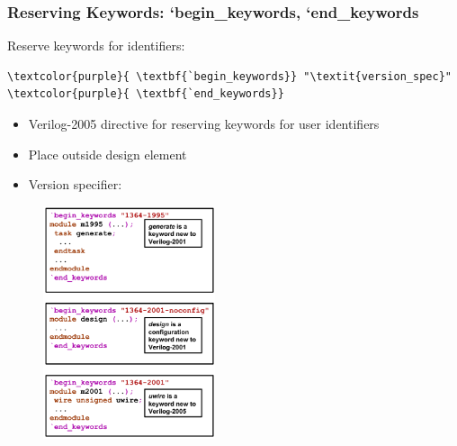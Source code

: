 \documentclass[t, notes, xcolor=table]{beamer}
\begin{document}
\begin{frame}[fragile]
\frametitle{Reserving Keywords: `begin\_keywords, `end\_keywords}
\scriptsize{
\begin{multicols}{2}
Reserve keywords for identifiers:
\begin{Verbatim}[commandchars=\\\{\}, tabsize=2]
\textcolor{purple}{	\textbf{`begin_keywords}} "\textit{version_spec}"
\textcolor{purple}{	\textbf{`end_keywords}}
\end{Verbatim}

\begin{itemize}
\item Verilog-2005 directive for reserving keywords for user identifiers
\item Place outside design element
\item Version specifier:
\end{itemize}
\vfill
\columnbreak
\begin{figure}
    \includegraphics[width=0.45\textwidth]{img/11_reserve_keywords.png}
\end{figure}
\end{multicols}

}
\end{frame}
\end{document}
